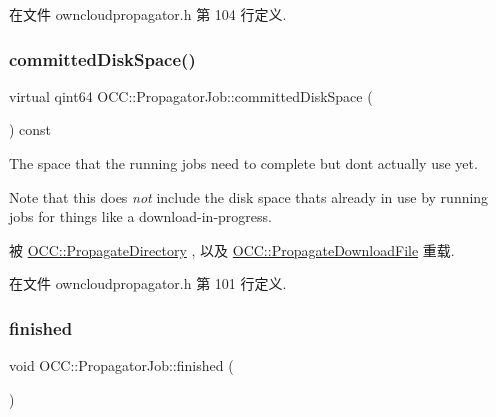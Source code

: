 在文件 owncloudpropagator.\+h 第 104 行定义.

\mbox{\label{class_o_c_c_1_1_propagator_job_a7bc39b8adaf93fd29668b768e1e7b20d}} 
\subsubsection{\texorpdfstring{committed\+Disk\+Space()}{committedDiskSpace()}}
{\footnotesize\ttfamily virtual qint64 O\+C\+C\+::\+Propagator\+Job\+::committed\+Disk\+Space (\begin{DoxyParamCaption}{ }\end{DoxyParamCaption}) const\hspace{0.3cm}{\ttfamily [virtual]}}

The space that the running jobs need to complete but don\textquotesingle{}t actually use yet.

Note that this does {\itshape not} include the disk space that\textquotesingle{}s already in use by running jobs for things like a download-\/in-\/progress. 

被 \hyperlink{class_o_c_c_1_1_propagate_directory_ae5794c246607f879d1715ea94b0d18e1}{O\+C\+C\+::\+Propagate\+Directory} , 以及 \hyperlink{class_o_c_c_1_1_propagate_download_file_afd083d008504e3b14c75d1de763e7d1e}{O\+C\+C\+::\+Propagate\+Download\+File} 重载.



在文件 owncloudpropagator.\+h 第 101 行定义.

\mbox{\label{class_o_c_c_1_1_propagator_job_a79edbc2126a62878e64c85289b6b847f}} 
\subsubsection{\texorpdfstring{finished}{finished}}
{\footnotesize\ttfamily void O\+C\+C\+::\+Propagator\+Job\+::finished (\begin{DoxyParamCaption}\item[{\hyperlink{class_o_c_c_1_1_sync_file_item_a149ade86eddd9661587bfbc9bcbca408}{Sync\+File\+Item\+::\+Status}}]{ }\end{DoxyParamCaption})\hspace{0.3cm}{\ttfamily [signal]}}

